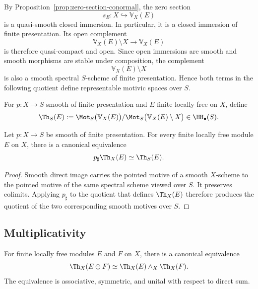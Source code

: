 By Proposition~\ref{prop:zero-section-conormal}, the zero section
\[
    s_E:X\hookrightarrow\mathbb V_X(E)
\]
is a quasi-smooth closed immersion.  In particular, it is a closed immersion
of finite presentation.  Its open complement
\[
    \mathbb V_X(E)\setminus X
    \longrightarrow
    \mathbb V_X(E)
\]
is therefore quasi-compact and open.  Since open immersions are smooth and
smooth morphisms are stable under composition, the complement
\[
    \mathbb V_X(E)\setminus X
\]
is also a smooth spectral \(S\)-scheme of finite presentation.  Hence both
terms in the following quotient define representable motivic spaces over
\(S\).

\begin{definition}
\label{def:relative-thom-motive}
For \(p:X\to S\) smooth of finite presentation and \(E\) finite locally free
on \(X\), define
\[
    \Th_S(E)
    :=
    \Mot_S\bigl(\mathbb V_X(E)\bigr)
    /
    \Mot_S\bigl(\mathbb V_X(E)\setminus X\bigr)
    \in
    \HH_\bullet(S).
\]
\end{definition}

\begin{proposition}
\label{prop:relative-thom-p-sharp}
Let $p:X\to S$ be smooth of finite presentation.  For every finite locally free module $E$ on $X$,
there is a canonical equivalence
\[
    p_\sharp\Th_X(E)
    \simeq
    \Th_S(E).
\]
\end{proposition}

\begin{proof}
Smooth direct image carries the pointed motive of a smooth $X$-scheme to the pointed motive of the
same spectral scheme viewed over $S$.  It preserves colimits.  Applying $p_\sharp$ to the quotient
that defines $\Th_X(E)$ therefore produces the quotient of the two corresponding smooth motives
over $S$.
\end{proof}

\subsection{Multiplicativity}

\begin{proposition}
\label{prop:unstable-thom-whitney}
For finite locally free modules $E$ and $F$ on $X$, there is a canonical equivalence
\[
    \Th_X(E\oplus F)
    \simeq
    \Th_X(E)\wedge_X\Th_X(F).
\]
The equivalence is associative, symmetric, and unital with respect to direct sum.
\end{proposition}

